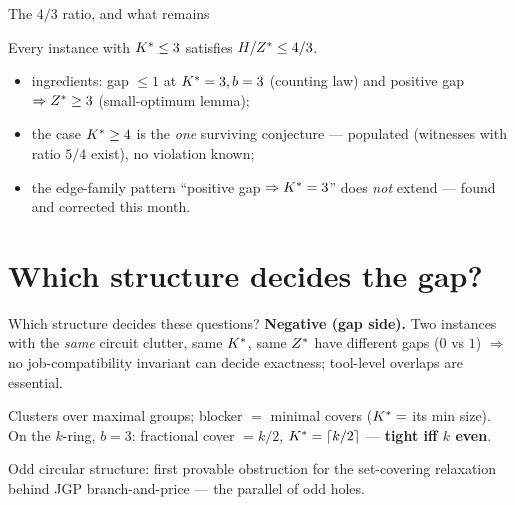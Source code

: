 \documentclass[10pt]{beamer}
\begin{document}
\begin{frame}{The $4/3$ ratio, and what remains}
\begin{theorem}[$b=3$]
Every instance with $K^{\ast}\le3$ satisfies $H/Z^{\ast}\le 4/3$.
\end{theorem}
\begin{itemize}
  \item ingredients: gap $\le1$ at $K^{\ast}=3,b=3$ (counting law) and
        positive gap $\Rightarrow Z^{\ast}\ge3$ (small-optimum lemma);
  \item the case $K^{\ast}\ge4$ is the \emph{one} surviving conjecture ---
        populated (witnesses with ratio $5/4$ exist), no violation known;
  \item the edge-family pattern ``positive gap $\Rightarrow K^{\ast}=3$'' does
        \emph{not} extend --- found and corrected this month.
\end{itemize}
\end{frame}

\section{Which structure decides the gap?}
\begin{frame}{Which structure decides these questions?}
\textbf{Negative (gap side).} Two instances with the \emph{same} circuit
clutter, same $K^{\ast}$, same $Z^{\ast}$ have different gaps ($0$ vs $1$)
$\Rightarrow$ no job-compatibility invariant can decide exactness;
tool-level overlaps are essential.
\vspace{2mm}
\begin{theorem}
Clusters over maximal groups; blocker $=$ minimal covers ($K^{\ast}=$ its min
size). On the $k$-ring, $b=3$: fractional cover $=k/2$, $K^{\ast}=\lceil
k/2\rceil$ --- \textbf{tight iff $k$ even}.
\end{theorem}
Odd circular structure: first provable obstruction for the set-covering
relaxation behind JGP branch-and-price --- the parallel of odd holes.
\end{frame}
\end{document}
